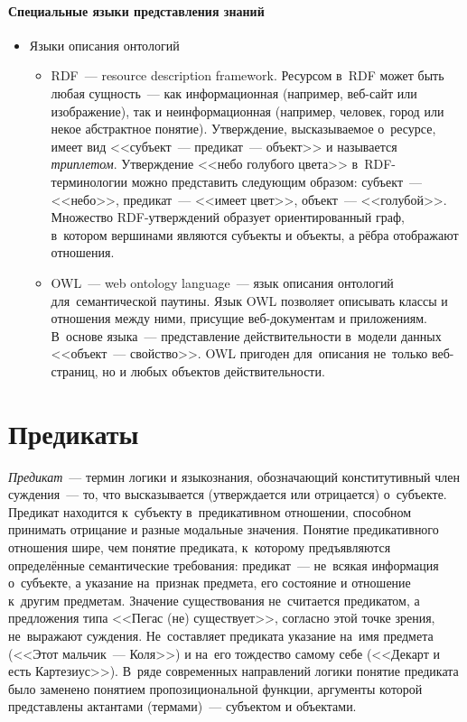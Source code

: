 \documentclass[12pt]{article}
\theoremstyle{definition}
\theoremstyle{remark}
\numberwithin{equation}{section}
\begin{document}
\paragraph{Специальные языки представления знаний}
\begin{itemize}
    \item Языки описания онтологий
    \begin{itemize}
        \item RDF~--- resource description framework. Ресурсом в~RDF
        может быть любая сущность~--- как информационная (например,
        веб-сайт или изображение), так и неинформационная (например,
        человек, город или некое абстрактное понятие). Утверждение,
        высказываемое о~ресурсе, имеет вид <<субъект~--- предикат~--- объект>>
        и называется \textsl{триплетом}. Утверждение <<небо голубого цвета>>
        в~RDF-терминологии можно представить следующим образом:
        субъект~--- <<небо>>, предикат~--- <<имеет цвет>>, объект~--- <<голубой>>.
        Множество RDF-утверждений образует ориентированный граф,
        в~котором вершинами являются субъекты и объекты, а рёбра
        отображают отношения.
        \item OWL~--- web ontology language~---  язык описания онтологий
        для~семантической паутины. Язык OWL позволяет описывать классы
        и отношения между ними, присущие веб-документам и приложениям.
        В~основе языка~--- представление действительности в~модели
        данных <<объект~--- свойство>>. OWL пригоден для~описания не~только
        веб-страниц, но и любых объектов действительности.
    \end{itemize}
\end{itemize}

\section{Предикаты}
\textsl{Предикат}~--- термин логики и языкознания, обозначающий
конститутивный член суждения~--- то, что высказывается (утверждается
или отрицается) о~субъекте. Предикат находится к~субъекту в~предикативном
отношении, способном принимать отрицание и разные модальные значения.
Понятие предикативного отношения шире, чем понятие предиката, к~которому
предъявляются определённые семантические требования: предикат~--- не~всякая информация
о~субъекте, а указание на~признак предмета, его состояние и отношение
к~другим предметам. Значение существования не~считается предикатом,
а предложения типа <<Пегас (не) существует>>, согласно этой точке зрения,
не~выражают суждения. Не~составляет предиката указание на~имя
предмета (<<Этот мальчик~--- Коля>>) и на~его тождество самому себе
(<<Декарт и есть Картезиус>>). В~ряде современных направлений логики
понятие предиката было заменено понятием пропозициональной функции,
аргументы которой представлены актантами (термами)~--- субъектом и
объектами.
\end{document}
